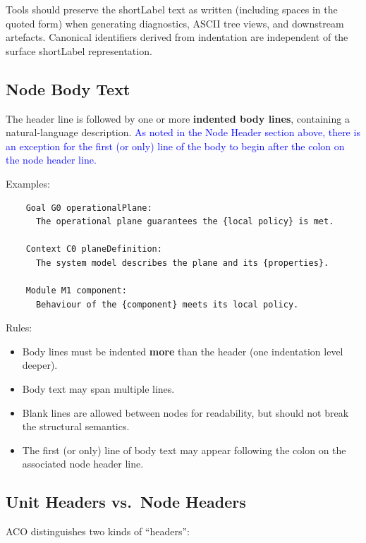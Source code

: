 \documentclass[11pt,twoside,a4paper]{article}
\begin{document}
Tools should preserve the shortLabel text as written (including spaces in the quoted form) when generating diagnostics, ASCII tree views, and downstream artefacts. Canonical identifiers derived from indentation are independent of the surface shortLabel representation.

\subsection{Node Body Text}

The header line is followed by one or more \textbf{indented body lines}, containing a natural-language description. \textcolor{blue}{As noted in the Node Header section above, there is an exception for the first (or only) line of the body to begin after the colon on the node header line.}

Examples:
\begin{verbatim}
    Goal G0 operationalPlane:
      The operational plane guarantees the {local policy} is met.

    Context C0 planeDefinition:
      The system model describes the plane and its {properties}.

    Module M1 component:
      Behaviour of the {component} meets its local policy.
\end{verbatim}

Rules:
\begin{itemize}[leftmargin=2em]
  \item Body lines must be indented \textbf{more} than the header (one indentation level deeper).
  \item Body text may span multiple lines.
  \item Blank lines are allowed between nodes for readability, but should not break the structural semantics.
  \item The first (or only) line of body text may appear following the colon on the associated node header line.
\end{itemize}

\subsection{Unit Headers vs.\ Node Headers}
ACO distinguishes two kinds of ``headers'':
\end{document}
